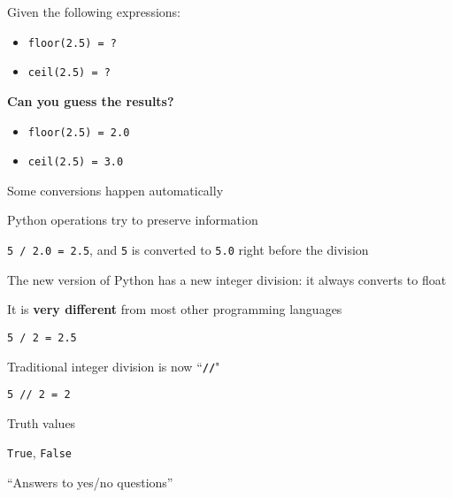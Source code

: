 \documentclass{beamer}
\begin{document}
\begin{slide}{
\item Given the following expressions:
\begin{itemize}
\item \texttt{floor(2.5) = ?} 
\item \texttt{ceil(2.5) = ?}
\end{itemize}
\item \textbf{Can you guess the results?}
\pause
\begin{itemize}
\item \texttt{floor(2.5) = 2.0}
\item \texttt{ceil(2.5) = 3.0}
\end{itemize}
}\end{slide}

\begin{slide}{
\item Some conversions happen automatically
\item Python operations try to preserve information
\item \texttt{5 / 2.0 = 2.5}, and \texttt{5} is converted to \texttt{5.0} right before the division
}\end{slide}

\begin{slide}{
\item The new version of Python has a new integer division: it always converts to float
\item It is \textbf{very different} from most other programming languages
\item \texttt{5 / 2 = 2.5}
}\end{slide}

\begin{slide}{
\item Traditional integer division is now ``\texttt{\textbf{//}}"
\item \texttt{5 // 2 = 2}
}\end{slide}

\begin{slide}{
\item Truth values
\item \texttt{True}, \texttt{False}
\item ``Answers to yes/no questions''
}\end{slide}
\end{document}
